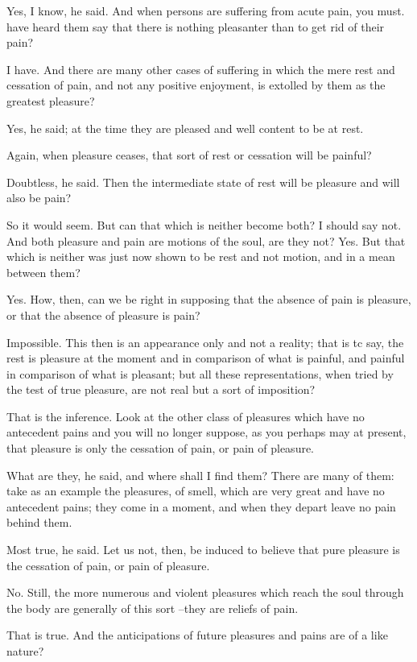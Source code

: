 Yes, I know, he said.
And when persons are suffering from acute pain, you must. have heard them say that there is nothing pleasanter than to get rid of their pain?

I have.
And there are many other cases of suffering in which the mere rest and cessation of pain, and not any positive enjoyment, is extolled by them as the greatest pleasure?

Yes, he said; at the time they are pleased and well content to be at rest.

Again, when pleasure ceases, that sort of rest or cessation will be painful?

Doubtless, he said.
Then the intermediate state of rest will be pleasure and will also be pain?

So it would seem.
But can that which is neither become both?
I should say not.
And both pleasure and pain are motions of the soul, are they not?
Yes.
But that which is neither was just now shown to be rest and not motion, and in a mean between them?

Yes.
How, then, can we be right in supposing that the absence of pain is pleasure, or that the absence of pleasure is pain?

Impossible.
This then is an appearance only and not a reality; that is tc say, the rest is pleasure at the moment and in comparison of what is painful, and painful in comparison of what is pleasant; but all these representations, when tried by the test of true pleasure, are not real but a sort of imposition?

That is the inference.
Look at the other class of pleasures which have no antecedent pains and you will no longer suppose, as you perhaps may at present, that pleasure is only the cessation of pain, or pain of pleasure.

What are they, he said, and where shall I find them?
There are many of them: take as an example the pleasures, of smell, which are very great and have no antecedent pains; they come in a moment, and when they depart leave no pain behind them.

Most true, he said.
Let us not, then, be induced to believe that pure pleasure is the cessation of pain, or pain of pleasure.

No.
Still, the more numerous and violent pleasures which reach the soul through the body are generally of this sort --they are reliefs of pain.

That is true.
And the anticipations of future pleasures and pains are of a like nature?

